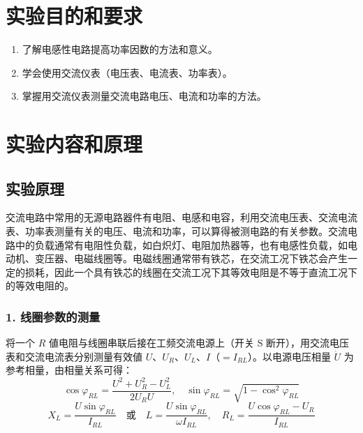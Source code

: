 \documentclass[10.5pt]{config}
\date{4.2}
\begin{document}
\makeheader %

\section{实验目的和要求}

\begin{enumerate}[label=\arabic*., leftmargin=2em]
    \item 了解电感性电路提高功率因数的方法和意义。
    \item 学会使用交流仪表（电压表、电流表、功率表）。
    \item 掌握用交流仪表测量交流电路电压、电流和功率的方法。
\end{enumerate}

\section{实验内容和原理}


\subsection{实验原理}

交流电路中常用的无源电路器件有电阻、电感和电容，利用交流电压表、交流电流表、功率表测量有关的电压、电流和功率，可以算得被测电路的有关参数。交流电路中的负载通常有电阻性负载，如白炽灯、电阻加热器等，也有电感性负载，如电动机、变压器、电磁线圈等。电磁线圈通常带有铁芯，在交流工况下铁芯会产生一定的损耗，因此一个具有铁芯的线圈在交流工况下其等效电阻是不等于直流工况下的等效电阻的。

\subsubsection*{1. 线圈参数的测量}

将一个 $R$ 値电阻与线圈串联后接在工频交流电源上（开关 S 断开），用交流电压表和交流电流表分别测量有效値 $U$、$U_R$、$U_L$、$I$（$=I_{RL}$）。以电源电压相量 $\dot{U}$ 为参考相量，由相量关系可得：
\begin{equation*}
    \cos\varphi_{RL} = \frac{U^2 + U_R^2 - U_L^2}{2U_R U}, \quad
    \sin\varphi_{RL} = \sqrt{1 - \cos^2\varphi_{RL}}
\end{equation*}
\begin{equation*}
    X_L = \frac{U\sin\varphi_{RL}}{I_{RL}} \quad \text{或} \quad
    L = \frac{U\sin\varphi_{RL}}{\omega I_{RL}}, \quad
    R_L = \frac{U\cos\varphi_{RL} - U_R}{I_{RL}}
\end{equation*}
\end{document}
